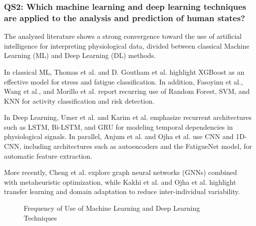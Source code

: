 \documentclass[runningheads]{llncs}
\begin{document}
\subsubsection*{QS2: Which machine learning and deep learning techniques are applied to the analysis and prediction of human states?}
\label{subsec:qs2}

The analyzed literature shows a strong convergence toward the use of artificial intelligence for interpreting physiological data, divided between classical Machine Learning (ML) and Deep Learning (DL) methods.

In classical ML, Thomas et al. and D. Goutham et al. \cite{thomas2025,goutham2025} highlight XGBoost as an effective model for stress and fatigue classification. In addition, Fasoyinu et al., Wang et al., and Morillo et al. \cite{fasoyinu2025,wang2024,albarran2025} report recurring use of Random Forest, SVM, and KNN for activity classification and risk detection.

In Deep Learning, Umer et al. and Karim et al. \cite{umer2025,karim2025} emphasize recurrent architectures such as LSTM, Bi-LSTM, and GRU for modeling temporal dependencies in physiological signals. In parallel, Anjum et al. and Ojha et al. \cite{anjum2025,ojha2024} use CNN and 1D-CNN, including architectures such as autoencoders and the FatigueNet model, for automatic feature extraction.

More recently, Cheng et al. \cite{cheng2025} explore graph neural networks (GNNs) combined with metaheuristic optimization, while Kakhi et al. and Ojha et al. \cite{kakhi2025,ojha2024} highlight transfer learning and domain adaptation to reduce inter-individual variability.

\begin{figure}[H]
\centering
{}
\caption{Frequency of Use of Machine Learning and Deep Learning Techniques}
\label{fig:tecnicas_ia}
\end{figure}
\end{document}
